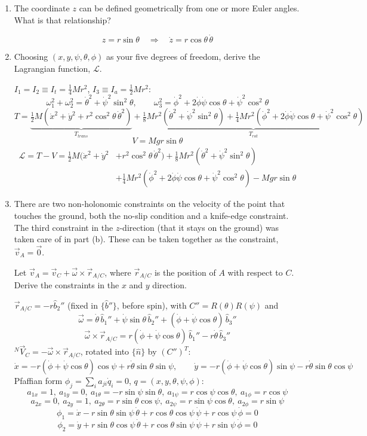 \documentclass[11pt]{article}
\begin{document}
\begin{enumerate}[label=(\alph*)]
    \item The coordinate $z$ can be defined geometrically from one or more Euler angles. What is that relationship?

    $$\boxed{z = r\sin\theta} \quad\Longrightarrow\quad \dot z = r\cos\theta\,\dot\theta$$

    \item Choosing $(x,y,\psi,\theta,\phi)$ as your five degrees of freedom, derive the Lagrangian function, $\mathcal L$.

    $I_1=I_2\equiv I_t=\tfrac14Mr^2$, $I_3\equiv I_a=\tfrac12Mr^2$:
    $$\omega_1^2+\omega_2^2 = \dot\theta^2+\dot\psi^2\sin^2\theta, \qquad \omega_3^2 = \dot\phi^2+2\dot\phi\dot\psi\cos\theta+\dot\psi^2\cos^2\theta$$
    $$T = \underbrace{\tfrac12M\left(\dot x^2+\dot y^2+r^2\cos^2\theta\,\dot\theta^2\right)}_{T_{trans}}+\underbrace{\tfrac18Mr^2\left(\dot\theta^2+\dot\psi^2\sin^2\theta\right)+\tfrac14Mr^2\left(\dot\phi^2+2\dot\phi\dot\psi\cos\theta+\dot\psi^2\cos^2\theta\right)}_{T_{rot}}$$
    $$\boxed{V = Mgr\sin\theta}$$
    $$\boxed{\begin{aligned}\mathcal L = T-V = \tfrac12M\Big(\dot x^2+\dot y^2&+r^2\cos^2\theta\,\dot\theta^2\Big)+\tfrac18Mr^2\left(\dot\theta^2+\dot\psi^2\sin^2\theta\right)\\ &+\tfrac14Mr^2\left(\dot\phi^2+2\dot\phi\dot\psi\cos\theta+\dot\psi^2\cos^2\theta\right)-Mgr\sin\theta\end{aligned}}$$

    \item There are two non-holonomic constraints on the velocity of the point that touches the ground, both the no-slip condition and a knife-edge constraint. The third constraint in the $z$-direction (that it stays on the ground) was taken care of in part (b). These can be taken together as the constraint, $\vec v_A = \vec 0$.

    Let $\vec v_A = \vec v_C + \vec\omega\times\vec r_{A/C}$, where $\vec r_{A/C}$ is the position of $A$ with respect to $C$. Derive the constraints in the $x$ and $y$ direction.

    $\vec r_{A/C}=-r\hat b_2''$ (fixed in $\{\hat b''\}$, before spin), with $C''=R(\theta)R(\psi)$ and
    $$\vec\omega = \dot\theta\,\hat b_1''+\dot\psi\sin\theta\,\hat b_2''+(\dot\phi+\dot\psi\cos\theta)\,\hat b_3''$$
    $$\vec\omega\times\vec r_{A/C} = r(\dot\phi+\dot\psi\cos\theta)\,\hat b_1''-r\dot\theta\,\hat b_3''$$
    ${}^N\vec V_C=-\vec\omega\times\vec r_{A/C}$, rotated into $\{\hat n\}$ by $(C'')^T$:
    $$\dot x = -r(\dot\phi+\dot\psi\cos\theta)\cos\psi+r\dot\theta\sin\theta\sin\psi, \qquad \dot y = -r(\dot\phi+\dot\psi\cos\theta)\sin\psi-r\dot\theta\sin\theta\cos\psi$$
    Pfaffian form $\phi_j=\sum_i a_{ji}\dot q_i=0$, $q=(x,y,\theta,\psi,\phi)$:
    $$a_{1x}=1,\ a_{1y}=0,\ a_{1\theta}=-r\sin\psi\sin\theta,\ a_{1\psi}=r\cos\psi\cos\theta,\ a_{1\phi}=r\cos\psi$$
    $$a_{2x}=0,\ a_{2y}=1,\ a_{2\theta}=r\sin\theta\cos\psi,\ a_{2\psi}=r\sin\psi\cos\theta,\ a_{2\phi}=r\sin\psi$$
    $$\boxed{\phi_1=\dot x-r\sin\theta\sin\psi\,\dot\theta+r\cos\theta\cos\psi\,\dot\psi+r\cos\psi\,\dot\phi=0}$$
    $$\boxed{\phi_2=\dot y+r\sin\theta\cos\psi\,\dot\theta+r\cos\theta\sin\psi\,\dot\psi+r\sin\psi\,\dot\phi=0}$$


\end{enumerate}
\end{document}
